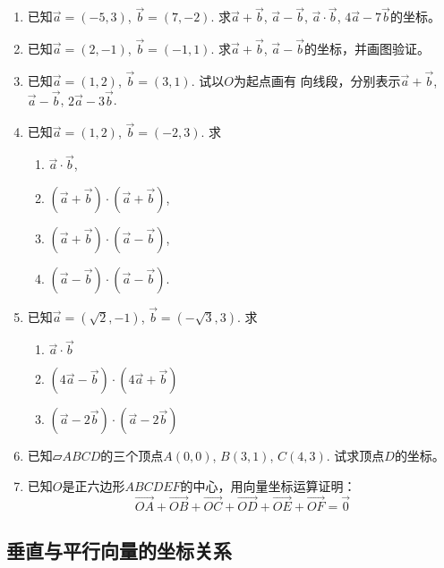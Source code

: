 \begin{ex}
\begin{enumerate}
    \item 已知$\vec{a}=(-5,3)$, $\vec{b}=(7,-2)$. 求$\vec{a}+\vec{b}$, $\vec{a}-\vec{b}$, $\vec{a}\cdot \vec{b}$, $4\vec{a}-7\vec{b}$的坐标。

    \item 已知$\vec{a}=(2,-1)$, $\vec{b}=(-1,1)$. 求$\vec{a}+\vec{b}$, 
    $\vec{a}-\vec{b}$的坐标，并画图验证。
    \item 已知$\vec{a}=(1,2)$, $\vec{b}=(3,1)$. 试以$O$为起点画有
    向线段，分别表示$\vec{a}+\vec{b}$, $\vec{a}-\vec{b}$, $2\vec{a}-3\vec{b}$.
    \item 已知$\vec{a}=(1,2)$, $\vec{b}=(-2,3)$. 求
\begin{multicols}{2}
\begin{enumerate}
    \item $\vec{a}\cdot \vec{b}$, 
    \item $(\vec{a}+\vec{b})\cdot (\vec{a}+\vec{b})$, 
    \item $(\vec{a}+\vec{b})\cdot (\vec{a}-\vec{b})$, 
    \item $(\vec{a}-\vec{b})\cdot (\vec{a}-\vec{b})$.
\end{enumerate}
\end{multicols}
    
\item 已知$\vec{a}=(\sqrt{2},-1)$, $\vec{b}=(-\sqrt{3},3)$. 求
\begin{multicols}{3}
  \begin{enumerate}
      \item $\vec{a}\cdot \vec{b}$
      \item $(4\vec{a}-\vec{b})\cdot (4\vec{a}+\vec{b})$
      \item $(\vec{a}-2\vec{b})\cdot (\vec{a}-2\vec{b})$
  \end{enumerate}  
\end{multicols}

\item 已知$\parallelogram{ABCD}$的三个顶点$A(0,0)$, $B(3,1)$, 
$C(4,3)$. 试求顶点$D$的坐标。
\item 已知$O$是正六边形$ABCDEF$的中心，用向量坐标运算证明：
\[\Vec{OA}+\Vec{OB}+\Vec{OC}+\Vec{OD}+\Vec{OE}+\Vec{OF}=\vec{0}\]
   \end{enumerate} 
\end{ex}

\subsection{垂直与平行向量的坐标关系}

